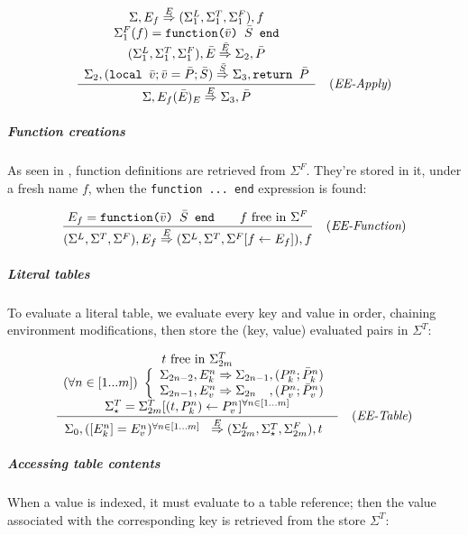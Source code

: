 $$ \frac{
  \begin{array}{c}
    \Sigma, E_f \stackrel{E}{\Rightarrow} (\Sigma_1^L,\Sigma_1^T,\Sigma_1^F), f\\
    \Sigma^F_1(f) = \texttt{function(}\bar v\texttt{)\ }\bar S\texttt{\ end}\\
    (\Sigma_1^L,\Sigma_1^T,\Sigma_1^F), \bar E \stackrel{\bar E}{\Rightarrow}
    \Sigma_2, \bar P\\
    \Sigma_2, (\texttt{local\ }\bar v; \bar v = \bar P; \bar S)
    \stackrel{\bar S}{\Rightarrow}
    \Sigma_3, \texttt{return\ }\bar P
  \end{array}
  }
  {\Sigma, E_f(\bar E)_E \stackrel{E}{\Rightarrow} \Sigma_3, \bar P}
  \quad
  (\textit{EE-Apply})$$

\subparagraph{Function creations}
As seen in , function definitions are retrieved from
$\Sigma^F$. They're stored in it, under a fresh name $f$, when the
{\tt function ... end} expression is found:

$$\frac{
  E_f = \texttt{function(}\bar v\texttt{)\ }\bar S\texttt{\ end}
  \qquad
  f \textrm{ free in } \Sigma^F
}{
  (\Sigma^L,\Sigma^T,\Sigma^F), E_f
  \stackrel{E}{\Rightarrow} 
  (\Sigma^L,\Sigma^T,\Sigma^F[f\leftarrow E_f]), f
}\quad(\textit{EE-Function})$$


\subparagraph{Literal tables}
To evaluate a literal table, we evaluate every key and value in order,
chaining environment modifications, then store the (key, value)
evaluated pairs in $\Sigma^T$:

$$\frac{
  \begin{array}{c}
    t \textrm{ free in } \Sigma_{2m}^T\\
    (\forall n\in[1...m])\ 
    \left\{
    \begin{array}{l}
    \Sigma_{2n-2}, E_k^n \evalsto \Sigma_{2n-1}, (P_k^n; \bar P_k^n)\\
    \Sigma_{2n-1}, E_v^n \evalsto \Sigma_{2n\phantom{-1}}, (P_v^n;
    \bar P_v^n)\\
    \end{array}\right.\\
    \Sigma^T_\star = \Sigma_{2m}^T
    [(t, P_k^n)\leftarrow P_v^n]^
    {\forall n\in[1...m]}
  \end{array}
}{
\Sigma_0, ([E_k^n]=E_v^n)^{\forall n\in[1...m]}\\
\evalstoE
(\Sigma_{2m}^L,\Sigma^T_\star,\Sigma_{2m}^F), t\\
}\quad\eqlabel{EE-Table}$$

\subparagraph{Accessing table contents}
When a value is indexed, it must evaluate to a table reference; then
the value associated with the corresponding key is retrieved from the
store $\Sigma^T$:

